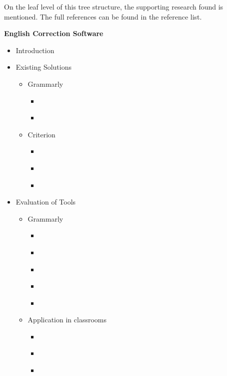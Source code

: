 \documentclass[a4paper,12pt,titlepage]{article}
\begin{document}
On the leaf level of this tree structure, the supporting research found is mentioned. The full references can be found in the reference list.

\vspace{5mm}
\textbf{English Correction Software}
\begin{itemize}
    \item Introduction
    \item Existing Solutions
    \begin{itemize}
        \item Grammarly
        \begin{itemize}
            \item \cite{dembsey_closing_2017}
            \item \cite{cavaleri_you_2016}
        \end{itemize}

        \item Criterion
        \begin{itemize}
            \item \cite{burstein_toward_2003}
            \item \cite{li_rethinking_2015}
            \item \cite{burstein_automated_2004}
        \end{itemize}

    \end{itemize}
    \item Evaluation of Tools
    \begin{itemize}
        \item Grammarly
        \begin{itemize}
            \item \cite{dembsey_closing_2017}
            \item \cite{cavaleri_you_2016}
            \item \cite{qassemzadeh_impact_2016}
            \item \cite{nova_utilizing_2018}
            \item \cite{ventayen_graduate_2018}
        \end{itemize}

        \item Application in classrooms
        \begin{itemize}
         \item \cite{li_rethinking_2015}
         \item \cite{warschauer_automated_2006}
         \item \cite{grimes_utility_2010}
        \end{itemize}


\end{itemize}
\end{itemize}
\end{document}
